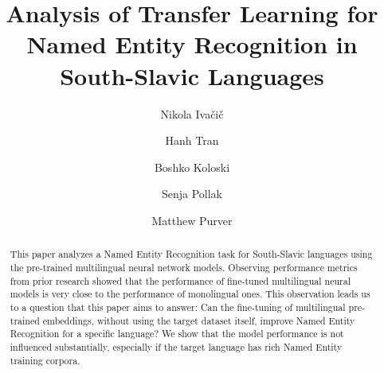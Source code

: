 \documentclass[sigconf]{acmart}
\begin{document}
\title{Analysis of Transfer Learning for Named Entity Recognition in South-Slavic Languages}

\author{Nikola Ivačič}


\author{Hanh Tran}
\author{Boshko Koloski}
\author{Senja Pollak}

\author{Matthew Purver}

\renewcommand{\shortauthors}{Ivačič et al.}

\begin{abstract}
  This paper analyzes a Named Entity Recognition task for South-Slavic languages using the pre-trained multilingual neural network models.
  Observing performance metrics from prior research showed that the performance of fine-tuned multilingual neural models is very close to the performance of monolingual ones.
  This observation leads us to a question that this paper aims to answer: Can the fine-tuning of multilingual pre-trained embeddings, without using the target dataset itself, improve Named Entity Recognition for a specific language?
  We show that the model performance is not influenced substantially, especially if the target language has rich Named Entity training corpora.
\end{abstract}
\end{document}
